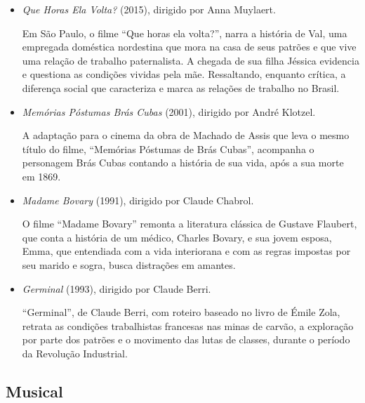 \documentclass[12pt]{extarticle}
\begin{document}
\begin{itemize}
\item\emph{Que Horas Ela Volta?} (2015), dirigido por Anna Muylaert.

Em São Paulo, o filme ``Que horas ela volta?'', narra a história de Val, 
uma empregada doméstica nordestina que mora na casa de seus patrões e 
que vive uma relação de trabalho paternalista. A chegada de sua filha 
Jéssica evidencia e questiona as condições vividas pela mãe. Ressaltando, 
enquanto crítica, a diferença social que caracteriza e marca as relações 
de trabalho no Brasil. 

\item\emph{Memórias Póstumas Brás Cubas} (2001), dirigido por André Klotzel.
 
A adaptação para o cinema da obra de Machado de Assis que leva o mesmo título 
do filme, ``Memórias Póstumas de Brás Cubas'', acompanha o personagem Brás Cubas 
contando a história de sua vida, após a sua morte em 1869.

\item\emph{Madame Bovary} (1991), dirigido por Claude Chabrol.

O filme ``Madame Bovary'' remonta a literatura clássica de Gustave Flaubert, que conta 
a história de um médico, Charles Bovary, e sua jovem esposa, Emma, que entendiada com a 
vida interiorana e com as regras impostas por seu marido e sogra, busca distrações em 
amantes.

\item\emph{Germinal} (1993), dirigido por Claude Berri.

``Germinal'', de Claude Berri, com roteiro baseado no livro de Émile Zola, retrata as 
condições trabalhistas francesas nas minas de carvão, a exploração por parte dos 
patrões e o movimento das lutas de classes, durante o período 
da Revolução Industrial.
\end{itemize}

\subsection{Musical}
\end{document}
